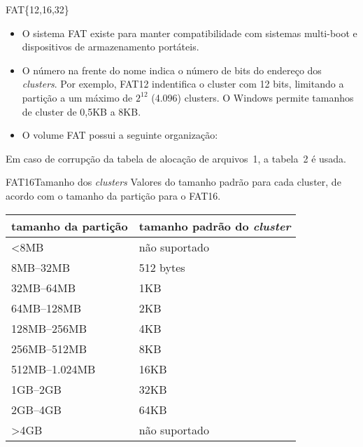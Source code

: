 \begin{frame}{FAT\{12,16,32\}}
  \small
  \begin{itemize}
  \item O sistema FAT existe para manter compatibilidade com sistemas
    multi-boot e dispositivos de armazenamento portáteis.\pause
  \item O número na frente do nome indica o número de bits do endereço
    dos {\em clusters}. Por exemplo, FAT12 indentifica o cluster com
    12 bits, limitando a partição a um máximo de $2^{12}$ (4.096)
    clusters. O Windows permite tamanhos de cluster de 0,5KB a
    8KB.\pause
  \item O volume FAT possui a seguinte organização:
  \end{itemize}


  \bigskip
  Em caso de corrupção da tabela de alocação de arquivos~1, a tabela~2 é usada.
\end{frame}

\begin{frame}{FAT16}{Tamanho dos {\em clusters}}
  Valores do tamanho padrão para cada cluster, de acordo com o tamanho
  da partição para o FAT16.

  \begin{center}
    \begin{tabular}[ht]{|l|l|}\hline
      \bf tamanho da partição & \bf tamanho padrão do {\em cluster} \\\hline
      <8MB & não suportado\\\hline
      8MB--32MB & 512 bytes\\\hline
      32MB--64MB & 1KB\\\hline
      64MB--128MB & 2KB\\\hline
      128MB--256MB & 4KB\\\hline
      256MB--512MB & 8KB\\\hline
      512MB--1.024MB & 16KB\\\hline
      1GB--2GB & 32KB\\\hline
      2GB--4GB & 64KB\\\hline
      >4GB & não suportado \\\hline
    \end{tabular}
  \end{center}

\end{frame}

